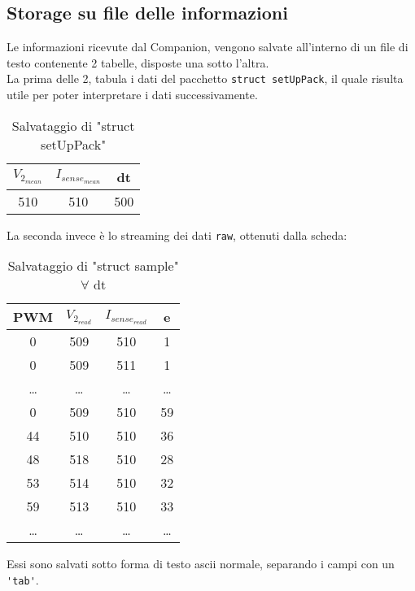 \subsection{Storage su file delle informazioni}\label{subsec:experimentStorage}
Le informazioni ricevute dal Companion, vengono salvate all'interno di un file di testo contenente 2 tabelle, disposte una sotto l'altra.\\
La prima delle 2, tabula i dati del pacchetto \verb|struct setUpPack|, il quale risulta utile per poter interpretare i dati successivamente.
\begin{table}[h]
	\centering
	\begin{tabular}[t]{|c|c|c|}
		\hline
		$ V_{2_{mean}} $ & $ I_{sense_{mean}}$ & dt  \\
		\hline
		510              & 510                 & 500 \\
		\hline
	\end{tabular}
	\caption[Salvataggio di "struct setUpPack"]{Salvataggio di "struct setUpPack"}
\end{table}

\noindent
La seconda invece è lo streaming dei dati \verb|raw|, ottenuti dalla scheda:
\begin{table}[h]
	\centering
	\begin{tabular}[t]{|c|c|c|c|}
		\hline
		PWM   & $ V_{2_{read}}$ & $ I_{sense_{read}}$ & e     \\
		\hline
		0     & 509             & 510                 & 1     \\
		0     & 509             & 511                 & 1     \\
		\dots & \dots           & \dots               & \dots \\
		0     & 509             & 510                 & 59    \\
		44    & 510             & 510                 & 36    \\
		48    & 518             & 510                 & 28    \\
		53    & 514             & 510                 & 32    \\
		59    & 513             & 510                 & 33    \\
		\dots & \dots           & \dots               & \dots \\
		\hline
	\end{tabular}
	\caption[Salvataggio di "struct sample" $\forall$ dt]{Salvataggio di "struct sample" $\forall$ dt}
\end{table}
\noindent
Essi sono salvati sotto forma di testo ascii normale, separando i campi con un \verb|'tab'|.

